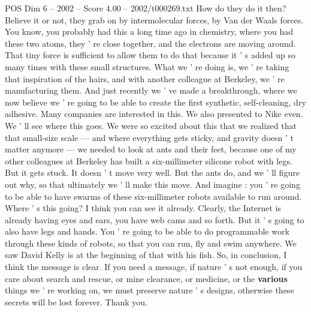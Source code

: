 \begin{textsample}{POS Dim 6 – 2002 – Score 4.00 – 2002/t000269.txt}
How do they do it then?
Believe it or not, they grab on by intermolecular forces, by Van der Waals forces.
You know, you probably had this a long time ago in chemistry, where you had these two atoms, they ' re close together, and the electrons are moving around.
That tiny force is sufficient to allow them to do that because it ' s added up so many times with these small structures.
What we ' re doing is, we ' re taking that inspiration of the hairs, and with another colleague at Berkeley, we ' re manufacturing them.
And just recently we ' ve made a breakthrough, where we now believe we ' re going to be able to create the first synthetic, self-cleaning, dry adhesive.
Many companies are interested in this.
We also presented to Nike even.
We ' ll see where this goes.
We were so excited about this that we realized that that small-size scale — and where everything gets sticky, and gravity doesn ' t matter anymore — we needed to look at ants and their feet, because one of my other colleagues at Berkeley has built a six-millimeter silicone robot with legs.
But it gets stuck.
It doesn ' t move very well.
But the ants do, and we ' ll figure out why, so that ultimately we ' ll make this move.
And imagine : you ' re going to be able to have swarms of these six-millimeter robots available to run around.
Where ' s this going?
I think you can see it already.
Clearly, the Internet is already having eyes and ears, you have web cams and so forth.
But it ' s going to also have legs and hands.
You ' re going to be able to do programmable work through these kinds of robots, so that you can run, fly and swim anywhere.
We saw David Kelly is at the beginning of that with his fish.
So, in conclusion, I think the message is clear.
If you need a message, if nature ' s not enough, if you care about search and rescue, or mine clearance, or medicine, or the \textbf{various} things we ' re working on, we must preserve nature ' s designs, otherwise these secrets will be lost forever.
Thank you.

\end{textsample}
